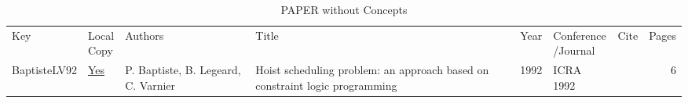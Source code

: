 {\scriptsize
\begin{longtable}{llp{5cm}p{10cm}rp{3cm}lr}
\rowcolor{white}\caption{PAPER without Concepts}\\ \toprule
\rowcolor{white}Key & \shortstack{Local\\Copy} & Authors & Title & Year & \shortstack{Conference\\/Journal} & Cite & Pages\\ \midrule
\endhead
\bottomrule
\endfoot
BaptisteLV92 & \href{papers/BaptisteLV92.pdf}{Yes} & P. Baptiste, B. Legeard, C. Varnier & Hoist scheduling problem: an approach based on constraint logic programming & 1992 & ICRA 1992 & \cite{BaptisteLV92} & 6\\\end{longtable}
}

